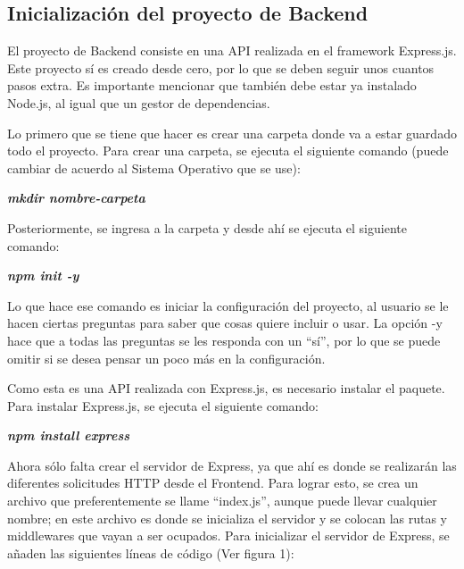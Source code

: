 \subsection{Inicialización del proyecto de Backend}
El proyecto de Backend consiste en una API realizada en el framework Express.js. Este proyecto sí es creado desde cero, por lo que se deben seguir unos cuantos pasos extra. Es importante mencionar que también debe estar ya instalado Node.js, al igual que un gestor de dependencias.

Lo primero que se tiene que hacer es crear una carpeta donde va a estar guardado todo el proyecto. Para crear una carpeta, se ejecuta el siguiente comando (puede cambiar de acuerdo al Sistema Operativo que se use):
    \begin{center}
        \textbf{
            \emph{
                mkdir nombre-carpeta
                }
            }
    \end{center}
Posteriormente, se ingresa a la carpeta y desde ahí se ejecuta el siguiente comando:
    \begin{center}
        \textbf{
            \emph{
                npm init -y
                }
            }
    \end{center}
Lo que hace ese comando es iniciar la configuración del proyecto, al usuario se le hacen ciertas preguntas para saber que cosas quiere incluir o usar. La opción -y hace que a todas las preguntas se les responda con un ``sí'', por lo que se puede omitir si se desea pensar un poco más en la configuración.

Como esta es una API realizada con Express.js, es necesario instalar el paquete. Para instalar Express.js, se ejecuta el siguiente comando:
    \begin{center}
        \textbf{
            \emph{
                npm install express
                }
            }
    \end{center}
Ahora sólo falta crear el servidor de Express, ya que ahí es donde se realizarán las diferentes solicitudes HTTP desde el Frontend. Para lograr esto, se crea un archivo que preferentemente se llame ``index.js'', aunque puede llevar cualquier nombre; en este archivo es donde se inicializa el servidor y se colocan las rutas y middlewares que vayan a ser ocupados. Para inicializar el servidor de Express, se añaden las siguientes líneas de código (Ver figura 1):

